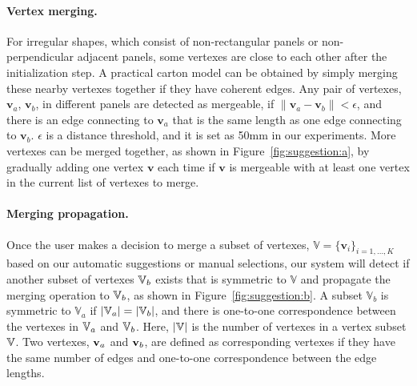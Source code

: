 \paragraph{Vertex merging.} 
For irregular shapes, which consist of non-rectangular panels or non-perpendicular adjacent panels, some vertexes are close to each other after the initialization step.
A practical carton model can be obtained by simply merging these nearby vertexes together if they have coherent edges.
%
Any pair of vertexes, $\mathbf{v}_a$, $\mathbf{v}_b$, in different panels are detected as mergeable, if $\|\mathbf{v}_a-\mathbf{v}_b\|<\epsilon$, and there is an edge connecting to $\mathbf{v}_a$ that is the same length as one edge connecting to $\mathbf{v}_b$.
%
$\epsilon$ is a distance threshold, and it is set as 50mm in our experiments.
More vertexes can be merged together, as shown in Figure~\ref{fig:suggestion:a}, by gradually adding one vertex $\mathbf{v}$ each time if $\mathbf{v}$ is mergeable with at least one vertex in the current list of vertexes to merge.  

\paragraph{Merging propagation.}  
Once the user makes a decision to merge a subset of vertexes, $\mathbb{V}=\{\mathbf{v}_i\}_{i=1,\ldots,K}$ based on our automatic suggestions or manual selections, our system will detect if another subset of vertexes $\mathbb{V}_b$ exists that is symmetric to $\mathbb{V}$ and propagate the merging operation to $\mathbb{V}_b$, as shown in Figure~\ref{fig:suggestion:b}. 
A subset $\mathbb{V}_b$ is symmetric to $\mathbb{V}_a$ if $|\mathbb{V}_a|=|\mathbb{V}_b|$, and there is one-to-one correspondence between the vertexes in $\mathbb{V}_a$ and $\mathbb{V}_b$. 
Here, $|\mathbb{V}|$ is the number of vertexes in a vertex subset $\mathbb{V}$. 
Two vertexes, $\mathbf{v}_a$ and $\mathbf{v}_b$, are defined as corresponding vertexes if they have the same number of edges and one-to-one correspondence between the edge lengths. 


